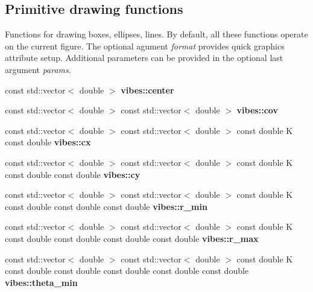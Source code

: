 \subsection*{Primitive drawing functions}
\label{_amgrp40669830a4f0e6a5b95068e28288c5c3}%
Functions for drawing boxes, ellipses, lines. By default, all these functions operate on the current figure. The optional agument {\itshape format} provides quick graphics attribute setup. Additional parameters can be provided in the optional last argument {\itshape params}. \begin{DoxyCompactItemize}
\item 
\mbox{\label{group__drawing_ga9901f3b48b74f7d5ffa483840b742f32}} 
const std\+::vector$<$ double $>$ {\bfseries vibes\+::center}
\item 
\mbox{\label{group__drawing_ga8bd149c32f77d5c10e1647d48330462c}} 
const std\+::vector$<$ double $>$ const std\+::vector$<$ double $>$ {\bfseries vibes\+::cov}
\item 
\mbox{\label{group__drawing_ga952412fbe0746111d400d335ec7c4158}} 
const std\+::vector$<$ double $>$ const std\+::vector$<$ double $>$ const double K const double {\bfseries vibes\+::cx}
\item 
\mbox{\label{group__drawing_gae7aca388a767ef73665baa14cbe5d59d}} 
const std\+::vector$<$ double $>$ const std\+::vector$<$ double $>$ const double K const double const double {\bfseries vibes\+::cy}
\item 
\mbox{\label{group__drawing_gaa2ed86434fea74c9203e26db508ca9b1}} 
const std\+::vector$<$ double $>$ const std\+::vector$<$ double $>$ const double K const double const double const double {\bfseries vibes\+::r\+\_\+min}
\item 
\mbox{\label{group__drawing_gab3bb7e2ed5cc2c0d08ebf5ed6c1bb299}} 
const std\+::vector$<$ double $>$ const std\+::vector$<$ double $>$ const double K const double const double const double const double {\bfseries vibes\+::r\+\_\+max}
\item 
\mbox{\label{group__drawing_gac58cd89d989ce5175af0a2aedc65a781}} 
const std\+::vector$<$ double $>$ const std\+::vector$<$ double $>$ const double K const double const double const double const double const double {\bfseries vibes\+::theta\+\_\+min}

\end{DoxyCompactItemize}
